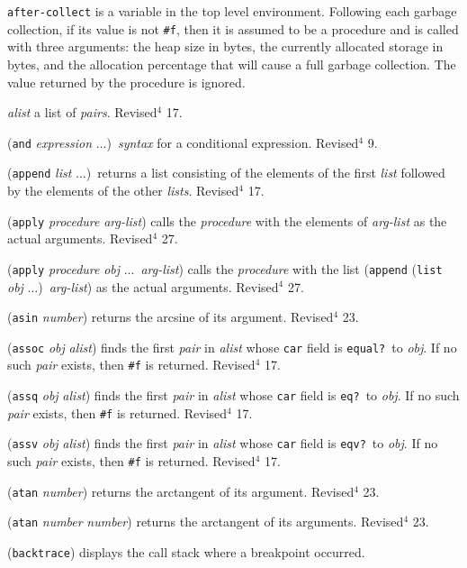 \documentclass[10pt,twocolumn]{article}
\begin{document}
\texttt{after-collect} is a variable in the top level environment.
Following each garbage collection, if its value is not \texttt{\#f},
then it is assumed to be a procedure and is called with three
arguments:  the heap size in bytes, the currently allocated
storage in bytes, and the allocation percentage that will
cause a full garbage collection.  The value returned by the
procedure is ignored.

\emph{alist} a list of \emph{pairs}.  Revised$^4$ 17.

(\texttt{and} \emph{expression} ...)\ \emph{syntax} for a conditional expression.
Revised$^4$ 9.

(\texttt{append} \emph{list} ...)\ returns a list consisting of the
elements of the first \emph{list} followed by the elements of the other
\emph{lists}.  Revised$^4$ 17.

(\texttt{apply} \emph{procedure} \emph{arg-list}) calls the \emph{procedure} with the
elements of \emph{arg-list} as the actual arguments.  Revised$^4$ 27.

(\texttt{apply} \emph{procedure} \emph{obj} ...\ \emph{arg-list}) calls the
\emph{procedure} with the list (\texttt{append} (\texttt{list} \emph{obj} ...)\
\emph{arg-list}) as the actual arguments.  Revised$^4$ 27.

(\texttt{asin} \emph{number}) returns the arcsine of its argument.
Revised$^4$ 23.

(\texttt{assoc} \emph{obj} \emph{alist}) finds the first \emph{pair} in \emph{alist} whose
\texttt{car} field is \texttt{equal?}\ to \emph{obj}.  If no such \emph{pair} exists, then
\texttt{\#f} is returned.  Revised$^4$ 17.

(\texttt{assq} \emph{obj} \emph{alist}) finds the first \emph{pair} in \emph{alist} whose
\texttt{car} field is \texttt{eq?}\ to \emph{obj}.  If no such \emph{pair} exists, then
\texttt{\#f} is returned.  Revised$^4$ 17.

(\texttt{assv} \emph{obj} \emph{alist}) finds the first \emph{pair} in \emph{alist} whose
\texttt{car} field is \texttt{eqv?}\ to \emph{obj}.  If no such \emph{pair} exists, then
\texttt{\#f} is returned.  Revised$^4$ 17.

(\texttt{atan} \emph{number}) returns the arctangent of its argument.
Revised$^4$ 23.

(\texttt{atan} \emph{number} \emph{number}) returns the arctangent of its arguments.
Revised$^4$ 23.

(\texttt{backtrace}) displays the call stack where a breakpoint occurred.
\end{document}

